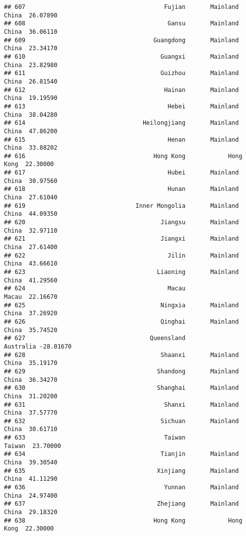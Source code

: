 \documentclass[
]{article}
\begin{document}
\begin{verbatim}
## 607                                       Fujian       Mainland China  26.07890
## 608                                        Gansu       Mainland China  36.06110
## 609                                    Guangdong       Mainland China  23.34170
## 610                                      Guangxi       Mainland China  23.82980
## 611                                      Guizhou       Mainland China  26.81540
## 612                                       Hainan       Mainland China  19.19590
## 613                                        Hebei       Mainland China  38.04280
## 614                                 Heilongjiang       Mainland China  47.86200
## 615                                        Henan       Mainland China  33.88202
## 616                                    Hong Kong            Hong Kong  22.30000
## 617                                        Hubei       Mainland China  30.97560
## 618                                        Hunan       Mainland China  27.61040
## 619                               Inner Mongolia       Mainland China  44.09350
## 620                                      Jiangsu       Mainland China  32.97110
## 621                                      Jiangxi       Mainland China  27.61400
## 622                                        Jilin       Mainland China  43.66610
## 623                                     Liaoning       Mainland China  41.29560
## 624                                        Macau                Macau  22.16670
## 625                                      Ningxia       Mainland China  37.26920
## 626                                      Qinghai       Mainland China  35.74520
## 627                                   Queensland            Australia -28.01670
## 628                                      Shaanxi       Mainland China  35.19170
## 629                                     Shandong       Mainland China  36.34270
## 630                                     Shanghai       Mainland China  31.20200
## 631                                       Shanxi       Mainland China  37.57770
## 632                                      Sichuan       Mainland China  30.61710
## 633                                       Taiwan               Taiwan  23.70000
## 634                                      Tianjin       Mainland China  39.30540
## 635                                     Xinjiang       Mainland China  41.11290
## 636                                       Yunnan       Mainland China  24.97400
## 637                                     Zhejiang       Mainland China  29.18320
## 638                                    Hong Kong            Hong Kong  22.30000

\end{verbatim}
\end{document}
